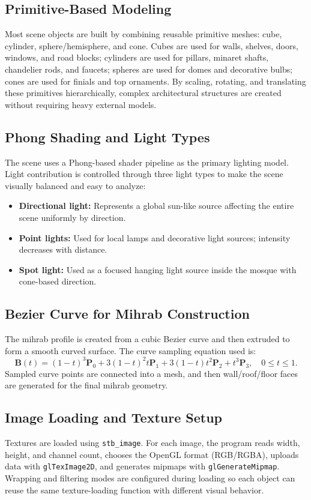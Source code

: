 \documentclass[a4paper,12pt]{extarticle}
\begin{document}
\subsection*{Primitive-Based Modeling}
Most scene objects are built by combining reusable primitive meshes: cube, cylinder, sphere/hemisphere, and cone. Cubes are used for walls, shelves, doors, windows, and road blocks; cylinders are used for pillars, minaret shafts, chandelier rods, and faucets; spheres are used for domes and decorative bulbs; cones are used for finials and top ornaments. By scaling, rotating, and translating these primitives hierarchically, complex architectural structures are created without requiring heavy external models.

\subsection*{Phong Shading and Light Types}
The scene uses a Phong-based shader pipeline as the primary lighting model. Light contribution is controlled through three light types to make the scene visually balanced and easy to analyze:
\begin{itemize}
    \item \textbf{Directional light:} Represents a global sun-like source affecting the entire scene uniformly by direction.
    \item \textbf{Point lights:} Used for local lamps and decorative light sources; intensity decreases with distance.
    \item \textbf{Spot light:} Used as a focused hanging light source inside the mosque with cone-based direction.
\end{itemize}

\subsection*{Bezier Curve for Mihrab Construction}
The mihrab profile is created from a cubic Bezier curve and then extruded to form a smooth curved surface. The curve sampling equation used is:
$$
\mathbf{B}(t) = (1-t)^3\mathbf{P}_0 + 3(1-t)^2 t\mathbf{P}_1 + 3(1-t)t^2\mathbf{P}_2 + t^3\mathbf{P}_3, \quad 0 \le t \le 1.
$$
Sampled curve points are connected into a mesh, and then wall/roof/floor faces are generated for the final mihrab geometry.

\subsection*{Image Loading and Texture Setup}
Textures are loaded using \texttt{stb\_image}. For each image, the program reads width, height, and channel count, chooses the OpenGL format (RGB/RGBA), uploads data with \texttt{glTexImage2D}, and generates mipmaps with \texttt{glGenerateMipmap}. Wrapping and filtering modes are configured during loading so each object can reuse the same texture-loading function with different visual behavior.
\end{document}
